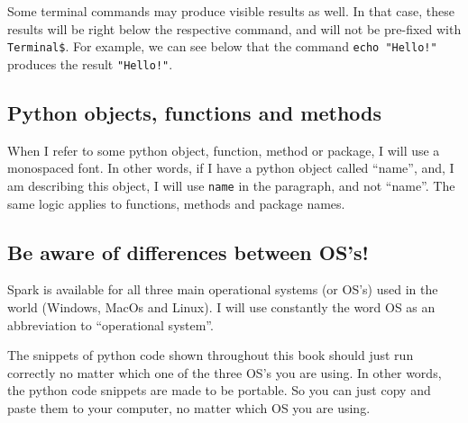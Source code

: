\documentclass[
  11pt,
  letterpaper,
  DIV=11,
  numbers=noendperiod]{scrreprt}
\newenvironment{Shaded}{\begin{snugshade}}{\end{snugshade}}
\newcommand{\NormalTok}[1]{\textcolor[rgb]{0.00,0.23,0.31}{#1}}
\begin{document}
\begin{Shaded}
\end{Shaded}

Some terminal commands may produce visible results as well. In that
case, these results will be right below the respective command, and will
not be pre-fixed with \texttt{Terminal\$}. For example, we can see below
that the command \texttt{echo\ "Hello!"} produces the result
\texttt{"Hello!"}.

\begin{Shaded}
\end{Shaded}

\hypertarget{python-objects-functions-and-methods}{%
\subsection*{Python objects, functions and
methods}\label{python-objects-functions-and-methods}}

When I refer to some python object, function, method or package, I will
use a monospaced font. In other words, if I have a python object called
``name'', and, I am describing this object, I will use \texttt{name} in
the paragraph, and not ``name''. The same logic applies to functions,
methods and package names.

\hypertarget{be-aware-of-differences-between-oss}{%
\subsection*{Be aware of differences between
OS's!}\label{be-aware-of-differences-between-oss}}

Spark is available for all three main operational systems (or OS's) used
in the world (Windows, MacOs and Linux). I will use constantly the word
OS as an abbreviation to ``operational system''.

The snippets of python code shown throughout this book should just run
correctly no matter which one of the three OS's you are using. In other
words, the python code snippets are made to be portable. So you can just
copy and paste them to your computer, no matter which OS you are using.
\end{document}
